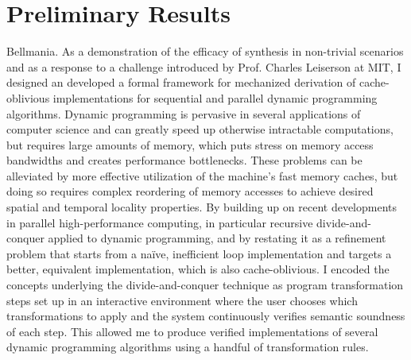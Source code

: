 \section{Preliminary Results}

\begin{paragraph}
{Bellmania.} As a demonstration of the efficacy of synthesis in non-trivial
scenarios and as a response to a challenge introduced by Prof. Charles Leiserson
at MIT,
I designed an developed a formal framework for mechanized derivation of 
cache-oblivious implementations for sequential and parallel 
dynamic programming algorithms. Dynamic programming is pervasive in several 
applications of computer science and can greatly speed up otherwise 
intractable computations, but requires large amounts of memory, 
which puts stress on memory access bandwidths and creates performance 
bottlenecks. These problems can be alleviated by more effective utilization 
of the machine’s fast memory caches, 
but doing so requires complex reordering of memory accesses to achieve 
desired spatial and temporal locality properties. 
By building up on recent developments in parallel high-performance computing, 
in particular recursive divide-and-conquer applied to dynamic programming,
and by restating it as a refinement problem that starts from a na\"ive, 
inefficient loop implementation and targets a better, 
equivalent implementation, which is also cache-oblivious. 
I encoded the concepts underlying the divide-and-conquer technique as program 
transformation steps set up in an interactive environment where the user chooses 
which transformations to apply and the system continuously verifies semantic 
soundness of each step. 
This allowed me to produce verified implementations of several dynamic programming 
algorithms using a handful of transformation rules.
\end{paragraph}
